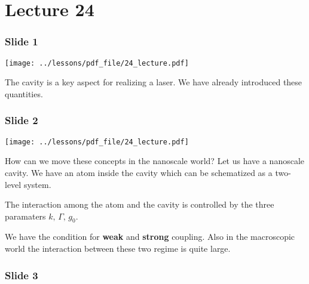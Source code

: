 \documentclass[../main/main.tex]{subfiles}
\begin{document}
\pagestyle{plain}

\section{Lecture 24}


\subsubsection*{Slide 1}

\begin{minipage}[]{0.5\linewidth}
\centering
\texttt{[image: ../lessons/pdf\_file/24\_lecture.pdf]}
\end{minipage}
\hspace{0.3cm}\vspace{0.3cm}
\begin{minipage}[c]{0.47\linewidth}

The cavity is a key aspect for realizing a laser. We have already introduced these quantities.


\end{minipage}

\subsubsection*{Slide 2}

\begin{minipage}[]{0.5\linewidth}
\centering
\texttt{[image: ../lessons/pdf\_file/24\_lecture.pdf]}
\end{minipage}
\hspace{0.3cm}\vspace{0.3cm}
\begin{minipage}[c]{0.47\linewidth}

How can we move these concepts in the nanoscale world? Let us have a nanoscale cavity. We have an atom inside the cavity which can be schematized as a two-level system.

The interaction among the atom and the cavity is controlled by the three paramaters \( k, \, \Gamma, \, g_0  \).

We have the condition for \textbf{weak} and \textbf{strong} coupling. Also in the macroscopic world the interaction between these two regime is quite large.

\end{minipage}

\subsubsection*{Slide 3}
\end{document}
